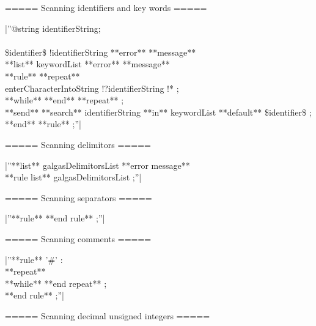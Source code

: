 ===== Scanning identifiers and key words =====

|''@string identifierString;\\ 
\\ 
\$identifier\$ !identifierString **error** **message** %
\\ 
**list** keywordList **error** **message** %
\\ 
**rule** %
 **repeat**\\ 
  enterCharacterIntoString !?identifierString !* ;\\ 
 **while** %
 **end** **repeat** ;\\ 
 **send** **search** identifierString **in** keywordList  **default** \$identifier\$ ;\\
**end** **rule** ;''|

===== Scanning delimitors =====

|''**list** galgasDelimitorsList **error message** %
\\ 
**rule list** galgasDelimitorsList ;''|

===== Scanning separators =====

|''**rule** %
**end rule** ;''|

===== Scanning comments =====

|''**rule** '\#' :\\ 
 **repeat**\\ 
 **while** %
 **end repeat** ;\\ 
**end rule** ;''|

===== Scanning decimal unsigned integers =====

